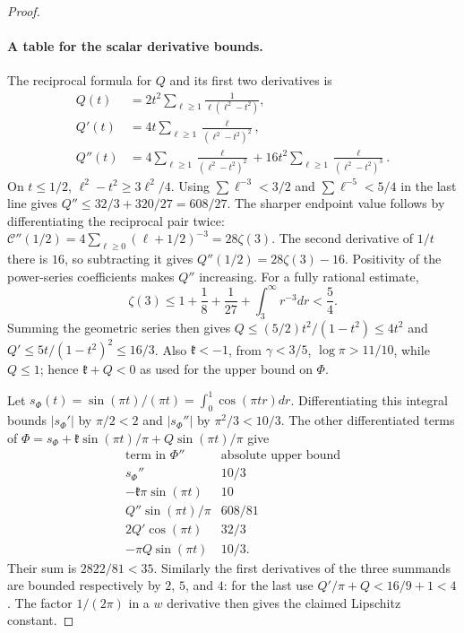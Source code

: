 \begin{proof}
\paragraph{A table for the scalar derivative bounds.}
The reciprocal formula for $Q$ and its first two derivatives is
\[
 \begin{aligned}
 Q(t)&=2t^2\sum_{\ell\geq1}\frac1{\ell(\ell^2-t^2)},\\
 Q'(t)&=4t\sum_{\ell\geq1}\frac{\ell}{(\ell^2-t^2)^2},\\
 Q''(t)&=4\sum_{\ell\geq1}\frac{\ell}{(\ell^2-t^2)^2}
           +16t^2\sum_{\ell\geq1}\frac{\ell}{(\ell^2-t^2)^3}.
 \end{aligned}
\]
On $t\leq1/2$, $\ell^2-t^2\geq3\ell^2/4$. Using
$\sum \ell^{-3}<3/2$ and $\sum \ell^{-5}<5/4$ in the last line gives
$Q''\leq32/3+320/27=608/27$. The sharper endpoint value follows
by differentiating the reciprocal pair twice:
$\mathcal C''(1/2)=4\sum_{\ell\geq0}(\ell+1/2)^{-3}=28\zeta(3)$.
The second derivative of $1/t$ there is $16$, so subtracting it gives
$Q''(1/2)=28\zeta(3)-16$. Positivity of the power-series coefficients
makes $Q''$ increasing. For a fully rational estimate,
\[
 \zeta(3)\leq1+\frac18+\frac1{27}+\int_3^\infty r^{-3}dr<\frac54.
\]
Summing the geometric series then gives
$Q\leq(5/2)t^2/(1-t^2)\leq4t^2$ and
$Q'\leq5t/(1-t^2)^2\leq16/3$. Also $\mathfrak k<-1$, from
$\gamma<3/5$, $\log\pi>11/10$, while $Q\leq1$; hence $\mathfrak k+Q<0$
as used for the upper bound on $\Phi$.

Let $s_\Phi(t)=\sin(\pi t)/(\pi t)=\int_0^1\cos(\pi tr)dr$.
Differentiating this integral bounds $|s_\Phi'|$ by $\pi/2<2$ and
$|s_\Phi''|$ by $\pi^2/3<10/3$. The other differentiated terms of
$\Phi=s_\Phi+\mathfrak{k}\sin(\pi t)/\pi+Q\sin(\pi t)/\pi$ give
\[
\begin{array}{cc}
 \text{term in }\Phi''&\text{absolute upper bound}\\ \hline
 s_\Phi''&10/3\\
 -\mathfrak{k}\pi\sin(\pi t)&10\\
 Q''\sin(\pi t)/\pi&608/81\\
 2Q'\cos(\pi t)&32/3\\
 -\pi Q\sin(\pi t)&10/3.
\end{array}
\]
Their sum is $2822/81<35$. Similarly the first derivatives of the
three summands are bounded respectively by $2$, $5$, and $4$:
for the last use $Q'/\pi+Q<16/9+1<4$. The factor $1/(2\pi)$
in a $w$ derivative then gives the claimed Lipschitz constant.


\end{proof}
